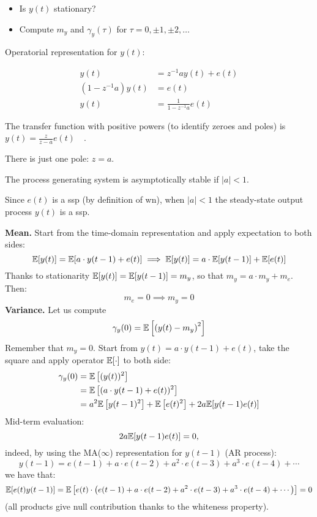 \begin{itemize}
	\item Is $y(t)$ stationary?
	\item Compute $m_{y}$ and $\gamma_{y}(\tau)$ for $\tau=0, \pm 1, \pm 2, \ldots$
\end{itemize}

Operatorial representation for $y(t)$:

\begin{align*}
	y(t)&=z^{-1} a y(t)+e(t) \\
	\left(1-z^{-1} a\right) y(t)&=e(t) \\
	y(t)&=\frac{1}{1-z^{-1} a} e(t)
\end{align*}

The transfer function with positive powers (to identify zeroes and poles) is $y(t)=\frac{z}{z-a} e(t) \quad$.

There is just one pole: $z=a .$

The process generating system is asymptotically stable if $|a| <1$. 

Since $e(t)$ is a \gls{ssp} (by definition of \gls{wn}), when $|a| <1$ the steady-state output process $y(t)$ is a \gls{ssp}.

\textbf{Mean.}
Start from the time-domain representation and apply expectation to both sides:
\[
	\mathbb{E}[y(t)]=\mathbb{E}[a \cdot y(t-1)+e(t)] \implies \mathbb{E}[y(t)]=a \cdot \mathbb{E}[y(t-1)]+\mathbb{E}[e(t)]
\]
Thanks to stationarity $\mathbb{E}[y(t)]=\mathbb{E}[y(t-1)]=m_{y}$, so that $m_{y}=a \cdot m_{y}+m_{e}$.
Then:
$$
m_{e}=0 \implies  m_{y}=0
$$
\textbf{Variance.}
Let us compute
\[
	\gamma_{y}(0)=\mathbb{E}\left[\left(y(t)-m_{y}\right)^{2}\right]
\]
Remember that $m_{y}=0$. Start from $y(t)=a \cdot y(t-1)+e(t)$, take the square and apply operator $\mathbb{E}[\cdot]$ to both side:
\begin{align*}
	\gamma_{y}(0)&=\mathbb{E}\left[(y(t))^{2}\right]\\
	&=\mathbb{E}\left[(a \cdot y(t-1)+e(t))^{2}\right]\\
	&=a^{2} \mathbb{E}\left[y(t-1)^{2}\right]+\mathbb{E}\left[e(t)^{2}\right]+2 a \mathbb{E}[y(t-1) e(t)]\\
\end{align*}
Mid-term evaluation:
\[
	2 a \mathbb{E}[y(t-1) e(t)]=0,
\]
indeed, by using the MA($\infty$) representation for $y(t-1)$ (AR process):
$$
y(t-1)=e(t-1)+a \cdot e(t-2)+a^{2} \cdot e(t-3)+a^{3} \cdot e(t-4)+\cdots
$$
we have that:
\[
	\mathbb{E}[e(t) y(t-1)]=\mathbb{E}\left[e(t) \cdot\left(e(t-1)+a \cdot e(t-2)+a^{2} \cdot e(t-3)+a^{3} \cdot e(t-4)+\cdots\right)\right]=0
\]
(all products give null contribution thanks to the whiteness property).


